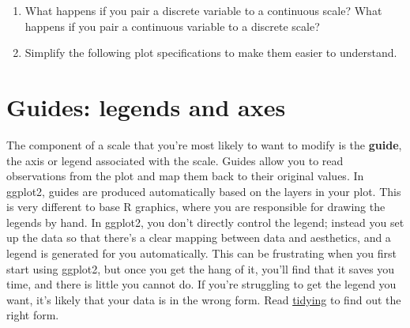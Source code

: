 \begin{enumerate}
\def\labelenumi{\arabic{enumi}.}
\item
  What happens if you pair a discrete variable to a continuous scale?
  What happens if you pair a continuous variable to a discrete scale?
\item
  Simplify the following plot specifications to make them easier to
  understand.

\begin{Shaded}
\begin{Highlighting}[]
\StringTok{ }
\StringTok{  }\NormalTok{(}\NormalTok{) +}\StringTok{ }
\StringTok{  }\NormalTok{() +}
\StringTok{  }\NormalTok{(}\NormalTok{(} 

\NormalTok{(}  \StringTok{ }
\StringTok{  }\NormalTok{(}\NormalTok{) +}\StringTok{ }
\StringTok{  }\NormalTok{(}\NormalTok{) +}
\StringTok{  }\NormalTok{(}\NormalTok{) +}\StringTok{ }
\StringTok{  }\NormalTok{() +}\StringTok{ }
\StringTok{  }\NormalTok{(}\NormalTok{(} \StringTok{ }
\StringTok{  }\NormalTok{(}\NormalTok{)}
\end{Highlighting}
\end{Shaded}
\end{enumerate}

\hypertarget{sec:guides}{\section{Guides: legends and
axes}\label{sec:guides}}

The component of a scale that you're most likely to want to modify is
the \textbf{guide}, the axis or legend associated with the scale. Guides
allow you to read observations from the plot and map them back to their
original values. In ggplot2, guides are produced automatically based on
the layers in your plot. This is very different to base R graphics,
where you are responsible for drawing the legends by hand. In ggplot2,
you don't directly control the legend; instead you set up the data so
that there's a clear mapping between data and aesthetics, and a legend
is generated for you automatically. This can be frustrating when you
first start using ggplot2, but once you get the hang of it, you'll find
that it saves you time, and there is little you cannot do. If you're
struggling to get the legend you want, it's likely that your data is in
the wrong form. Read \protect\hyperlink{cha:data}{tidying} to find out
the right form.

